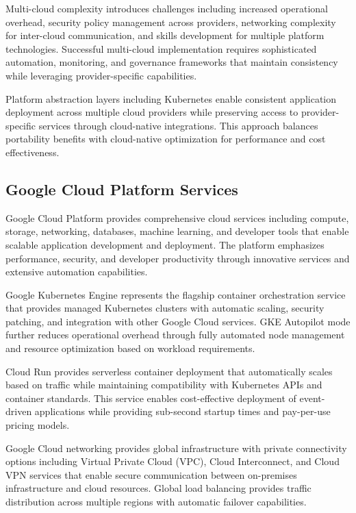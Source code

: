 Multi-cloud complexity introduces challenges including increased operational overhead, security policy management across providers, networking complexity for inter-cloud communication, and skills development for multiple platform technologies. Successful multi-cloud implementation requires sophisticated automation, monitoring, and governance frameworks that maintain consistency while leveraging provider-specific capabilities.

Platform abstraction layers including Kubernetes enable consistent application deployment across multiple cloud providers while preserving access to provider-specific services through cloud-native integrations. This approach balances portability benefits with cloud-native optimization for performance and cost effectiveness.

\subsection{Google Cloud Platform Services}

Google Cloud Platform provides comprehensive cloud services including compute, storage, networking, databases, machine learning, and developer tools that enable scalable application development and deployment. The platform emphasizes performance, security, and developer productivity through innovative services and extensive automation capabilities.

Google Kubernetes Engine represents the flagship container orchestration service that provides managed Kubernetes clusters with automatic scaling, security patching, and integration with other Google Cloud services. GKE Autopilot mode further reduces operational overhead through fully automated node management and resource optimization based on workload requirements.

Cloud Run provides serverless container deployment that automatically scales based on traffic while maintaining compatibility with Kubernetes APIs and container standards. This service enables cost-effective deployment of event-driven applications while providing sub-second startup times and pay-per-use pricing models.

Google Cloud networking provides global infrastructure with private connectivity options including Virtual Private Cloud (VPC), Cloud Interconnect, and Cloud VPN services that enable secure communication between on-premises infrastructure and cloud resources. Global load balancing provides traffic distribution across multiple regions with automatic failover capabilities.


